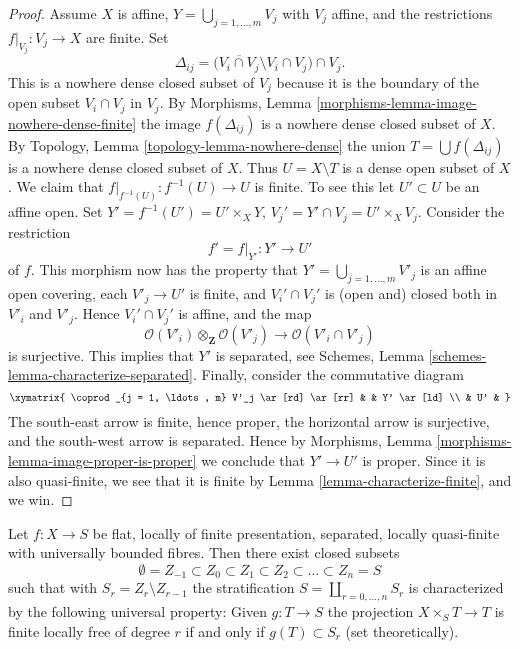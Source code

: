 \begin{proof}
\medskip\noindent
Assume $X$ is affine, $Y = \bigcup_{j = 1, \ldots, m} V_j$ with $V_j$ affine,
and the restrictions $f|_{V_j} : V_j \to X$ are finite.
Set
$$
\Delta_{ij} =
\Big(\overline{V_i \cap V_j} \setminus V_i \cap V_j\Big) \cap V_j.
$$
This is a nowhere dense closed subset of $V_j$ because it is the boundary
of the open subset $V_i \cap V_j$ in $V_j$. By
Morphisms, Lemma \ref{morphisms-lemma-image-nowhere-dense-finite}
the image $f(\Delta_{ij})$ is a nowhere dense closed subset of $X$. By
Topology, Lemma \ref{topology-lemma-nowhere-dense}
the union $T = \bigcup f(\Delta_{ij})$ is a nowhere dense closed
subset of $X$. Thus $U = X \setminus T$ is a dense open subset of $X$.
We claim that $f|_{f^{-1}(U)} : f^{-1}(U) \to U$ is finite.
To see this let $U' \subset U$ be an affine open.
Set $Y' = f^{-1}(U') = U' \times_X Y$,
$V_j' = Y' \cap V_j = U' \times_X V_j$. Consider the restriction
$$
f' = f|_{Y'} : Y' \longrightarrow U'
$$
of $f$. This morphism now has the property that
$Y' = \bigcup_{j = 1, \ldots, m} V'_j$ is an affine open covering,
each $V'_j \to U'$ is finite, and $V_i' \cap V_j'$ is (open and) closed
both in $V'_i$ and $V'_j$. Hence $V_i' \cap V_j'$ is affine, and the map
$$
\mathcal{O}(V'_i) \otimes_{\mathbf{Z}} \mathcal{O}(V'_j)
\longrightarrow
\mathcal{O}(V'_i \cap V'_j)
$$
is surjective. This implies that $Y'$ is separated, see
Schemes, Lemma \ref{schemes-lemma-characterize-separated}.
Finally, consider the commutative diagram
$$
\xymatrix{
\coprod_{j = 1, \ldots, m} V'_j \ar[rd] \ar[rr] & & Y' \ar[ld] \\
& U' &
}
$$
The south-east arrow is finite, hence proper, the horizontal arrow is
surjective, and the south-west arrow is separated. Hence by
Morphisms, Lemma \ref{morphisms-lemma-image-proper-is-proper}
we conclude that $Y' \to U'$ is proper. Since it is also quasi-finite,
we see that it is finite by Lemma \ref{lemma-characterize-finite},
and we win.
\end{proof}

\begin{lemma}
\label{lemma-stratify-flat-fp-lqf-universally-bounded}
Let $f : X \to S$ be flat, locally of finite presentation, separated,
locally quasi-finite with universally bounded fibres. Then there exist
closed subsets
$$
\emptyset = Z_{-1} \subset Z_0 \subset Z_1 \subset Z_2 \subset
\ldots \subset Z_n = S
$$
such that with $S_r = Z_r \setminus Z_{r - 1}$ the stratification
$S = \coprod_{r = 0, \ldots, n} S_r$ is characterized by the following
universal property: Given $g : T \to S$ the projection
$X \times_S T \to T$ is finite locally
free of degree $r$ if and only if $g(T) \subset S_r$ (set theoretically).
\end{lemma}

